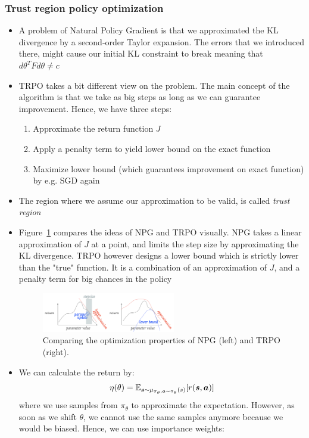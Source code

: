 \subsubsection{Trust region policy optimization}
\begin{itemize}
	\item A problem of Natural Policy Gradient is that we approximated the KL divergence by a second-order Taylor expansion. The errors that we introduced there, might cause our initial KL constraint to break meaning that $d\theta^T F d\theta\neq c$
	\item TRPO takes a bit different view on the problem. The main concept of the algorithm is that we take as big steps as long as we can guarantee improvement. Hence, we have three steps:
	\begin{enumerate}
		\item Approximate the return function $J$
		\item Apply a penalty term to yield lower bound on the exact function
		\item Maximize lower bound (which guarantees improvement on exact function) by e.g. SGD again
	\end{enumerate} 
	\item The region where we assume our approximation to be valid, is called \textit{trust region}
	\item Figure~\ref{fig:rl_policy_gradients_TRPO_vs_NPG} compares the ideas of NPG and TRPO visually. NPG takes a linear approximation of $J$ at a point, and limits the step size by approximating the KL divergence. TRPO however designs a lower bound which is strictly lower than the "true" function. It is a combination of an approximation of $J$, and a penalty term for big chances in the policy 
	\begin{figure}[ht!]
		\centering
		\includegraphics[width=0.55\textwidth]{figures/rl_policy_gradients_TRPO_vs_NPG.png}
		\caption{Comparing the optimization properties of NPG (left) and TRPO (right).}
		\label{fig:rl_policy_gradients_TRPO_vs_NPG}
	\end{figure}
	\item We can calculate the return by:
	$$\eta(\theta)=\mathbb{E}_{\bm{s}\sim \mu_{\pi_{\theta},\bm{a}\sim \pi_{\theta} }(s)}[r(\bm{s},\bm{a})]$$
	where we use samples from $\pi_{\theta}$ to approximate the expectation. However, as soon as we shift $\theta$, we cannot use the same samples anymore because we would be biased. Hence, we can use importance weights:

\end{itemize}
